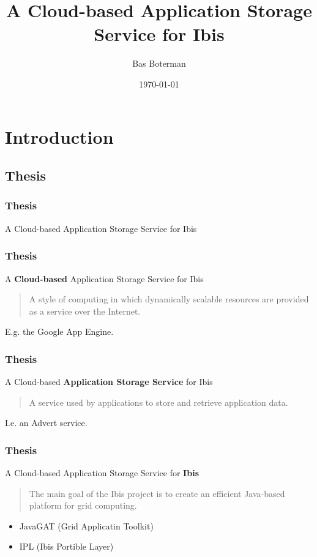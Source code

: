 \documentclass{beamer}
\title{A Cloud-based Application Storage Service \newline for Ibis}
\author{Bas Boterman}
\date{\today}
\begin{document}

\section[Outline]{}
\frame{\tableofcontents}

\section{Introduction}
\subsection{Thesis}
\frame
{
  \frametitle{Thesis}
  A Cloud-based Application Storage Service for Ibis 
  \newline 
  \newline 
  \newline
  \newline 
}

\frame
{
  \frametitle{Thesis}
  A \textbf{Cloud-based} Application Storage Service for Ibis
  
  \begin{quote}
  A style of computing in which dynamically scalable resources are provided as a service over the Internet.
  \end{quote}

  E.g. the Google App Engine.
}

\frame
{
  \frametitle{Thesis}
  A Cloud-based \textbf{Application Storage Service} for Ibis
  
  \begin{quote}
  A service used by applications to store and retrieve application data.
  \end{quote}

  I.e. an Advert service.
}

\frame
{
  \frametitle{Thesis}
  A Cloud-based Application Storage Service for \textbf{Ibis}
  
  \begin{quote}
  The main goal of the Ibis project is to create an efficient Java-based platform for grid computing.
  \end{quote}

  \begin{itemize}
    \item JavaGAT (Grid Applicatin Toolkit)
    \item IPL (Ibis Portible Layer)
  \end{itemize}
}
\end{document}
